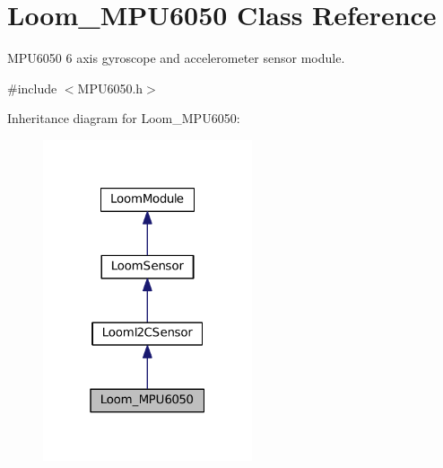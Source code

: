 \hypertarget{class_loom___m_p_u6050}{}\section{Loom\+\_\+\+M\+P\+U6050 Class Reference}
\label{class_loom___m_p_u6050}


M\+P\+U6050 6 axis gyroscope and accelerometer sensor module.  




{\ttfamily \#include $<$M\+P\+U6050.\+h$>$}



Inheritance diagram for Loom\+\_\+\+M\+P\+U6050\+:\nopagebreak
\begin{figure}[H]
\begin{center}
\leavevmode
\includegraphics[width=175pt]{class_loom___m_p_u6050__inherit__graph}
\end{center}
\end{figure}
